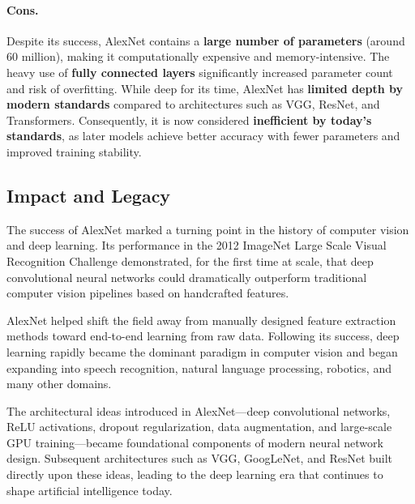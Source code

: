 \documentclass{article}
\begin{document}
\paragraph{Cons.}
Despite its success, AlexNet contains a \textbf{large number of parameters} (around 60 million), making it computationally expensive and memory-intensive. The heavy use of \textbf{fully connected layers} significantly increased parameter count and risk of overfitting. While deep for its time, AlexNet has \textbf{limited depth by modern standards} compared to architectures such as VGG, ResNet, and Transformers. Consequently, it is now considered \textbf{inefficient by today’s standards}, as later models achieve better accuracy with fewer parameters and improved training stability.


\subsection{Impact and Legacy}

The success of AlexNet marked a turning point in the history of computer vision and deep learning. Its performance in the 2012 ImageNet Large Scale Visual Recognition Challenge demonstrated, for the first time at scale, that deep convolutional neural networks could dramatically outperform traditional computer vision pipelines based on handcrafted features.

AlexNet helped shift the field away from manually designed feature extraction methods toward end-to-end learning from raw data. Following its success, deep learning rapidly became the dominant paradigm in computer vision and began expanding into speech recognition, natural language processing, robotics, and many other domains.

The architectural ideas introduced in AlexNet—deep convolutional networks, ReLU activations, dropout regularization, data augmentation, and large-scale GPU training—became foundational components of modern neural network design. Subsequent architectures such as VGG, GoogLeNet, and ResNet built directly upon these ideas, leading to the deep learning era that continues to shape artificial intelligence today.

\end{document}

